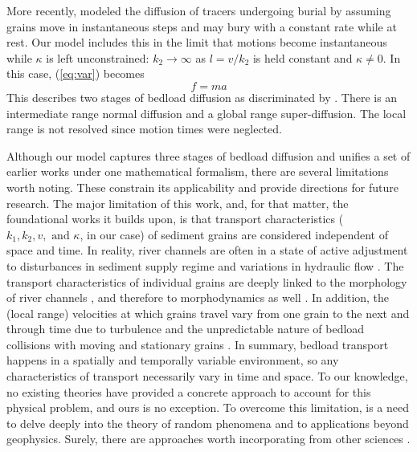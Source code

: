 \documentclass[]{agujournal2018}
\newcommand\be{\begin{equation}}
\newcommand\ee{\end{equation}}
\begin{document}
More recently, \citet{Wu2019} modeled the diffusion of tracers undergoing burial by assuming grains move in instantaneous steps and may bury with a constant rate while at rest.
Our model includes this in the limit that motions become instantaneous while $\kappa$ is left unconstrained: $k_2 \rightarrow \infty$ as $l = v/k_2$ is held constant and $\kappa \neq 0$.
In this case, (\ref{eq:var}) becomes
\be f=ma \ee
This describes two stages of bedload diffusion as discriminated by \citet{Wu2019}.
There is an intermediate range normal diffusion and a global range super-diffusion.
The local range is not resolved since motion times were neglected.

Although our model captures three stages of bedload diffusion and unifies a set of earlier works under one mathematical formalism, there are several limitations worth noting.
These constrain its applicability and provide directions for future research.
The major limitation of this work, and, for that matter, the foundational works it builds upon, is that transport characteristics ($k_1, k_2, v, \text{ and }\kappa$, in our case) of sediment grains are considered independent of space and time.
In reality, river channels are often in a state of active adjustment to disturbances in sediment supply regime and variations in hydraulic flow \citep{Church2017}. 
The transport characteristics of individual grains are deeply linked to the morphology of river channels \citep{Hassan2017}, and therefore to morphodynamics as well \citep[e.g.][]{Dhont2018}.
In addition, the (local range) velocities at which grains travel vary from one grain to the next \citep{Fathel2015, Heyman2016} and through time \citep{Fan2014, Ancey2014a} due to turbulence \citep{Celik2014} and the unpredictable nature of bedload collisions with moving \citep{Lee2002} and stationary grains \citep{Gordon1972}.
In summary, bedload transport happens in a spatially and temporally variable environment, so any characteristics of transport necessarily vary in time and space.
To our knowledge, no existing theories have provided a concrete approach to account for this physical problem, and ours is no exception.
To overcome this limitation, is a need to delve deeply into the theory of random phenomena and to applications beyond geophysics.
Surely, there are approaches worth incorporating from other sciences \citep[e.g.][]{Kutner2017}.
\end{document}
